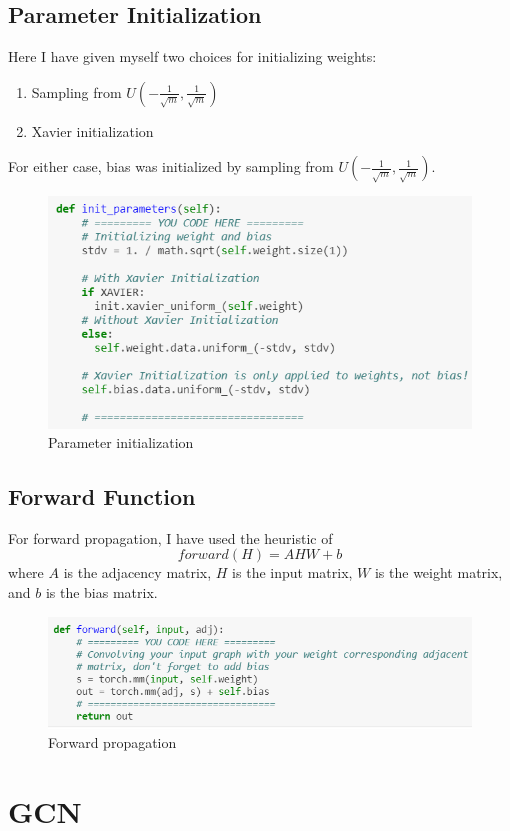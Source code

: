 \subsection{Parameter Initialization}

Here I have given myself two choices for initializing weights:
\begin{enumerate}
\item Sampling from $U \left(-\frac{1}{\sqrt{m}}, \frac{1}{\sqrt{m}}\right)$\cite{Goodfellow2016}
\item Xavier initialization\cite{Glorot2010}
\end{enumerate}

For either case, bias was initialized by sampling from $U \left(-\frac{1}{\sqrt{m}}, \frac{1}{\sqrt{m}}\right)$.

\begin{figure}[htbp]
\centering
\includegraphics[width=0.6\linewidth]{implementation/fig/code2.png}
\caption{Parameter initialization}
\label{fig:code2}
\end{figure}

\subsection{Forward Function}

For forward propagation, I have used the heuristic of
$$forward(H) = A H W + b$$
where $A$ is the adjacency matrix, $H$ is the input matrix, $W$ is the weight matrix, and $b$ is the bias matrix.

\begin{figure}[htbp]
\centering
\includegraphics[width=0.6\linewidth]{implementation/fig/code3.png}
\caption{Forward propagation}
\label{fig:code3}
\end{figure}

\section{GCN}

